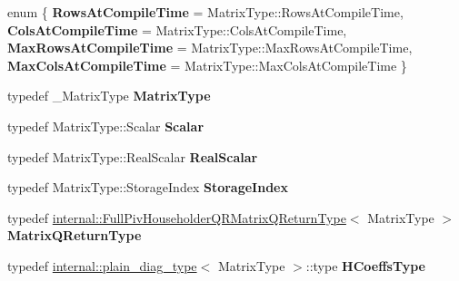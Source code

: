 \begin{DoxyCompactItemize}
\item 
\mbox{\label{class_eigen_1_1_full_piv_householder_q_r_a9ffbaa6905395cb6b370116de617446d}} 
enum \{ {\bfseries Rows\+At\+Compile\+Time} = Matrix\+Type\+::Rows\+At\+Compile\+Time, 
{\bfseries Cols\+At\+Compile\+Time} = Matrix\+Type\+::Cols\+At\+Compile\+Time, 
{\bfseries Max\+Rows\+At\+Compile\+Time} = Matrix\+Type\+::Max\+Rows\+At\+Compile\+Time, 
{\bfseries Max\+Cols\+At\+Compile\+Time} = Matrix\+Type\+::Max\+Cols\+At\+Compile\+Time
 \}
\item 
\mbox{\label{class_eigen_1_1_full_piv_householder_q_r_aad34d3573bf47e18888d1bb4801e7473}} 
typedef \+\_\+\+Matrix\+Type {\bfseries Matrix\+Type}
\item 
\mbox{\label{class_eigen_1_1_full_piv_householder_q_r_a30eb2e756bcd1c1148142a3a0deb6f88}} 
typedef Matrix\+Type\+::\+Scalar {\bfseries Scalar}
\item 
\mbox{\label{class_eigen_1_1_full_piv_householder_q_r_a22c6a854a83225617e56c03cbdbc94c3}} 
typedef Matrix\+Type\+::\+Real\+Scalar {\bfseries Real\+Scalar}
\item 
\mbox{\label{class_eigen_1_1_full_piv_householder_q_r_a55934e8ed065b629ca86382863fc66b0}} 
typedef Matrix\+Type\+::\+Storage\+Index {\bfseries Storage\+Index}
\item 
\mbox{\label{class_eigen_1_1_full_piv_householder_q_r_aca49f0aada2187c4b37b59211188a267}} 
typedef \mbox{\hyperlink{struct_eigen_1_1internal_1_1_full_piv_householder_q_r_matrix_q_return_type}{internal\+::\+Full\+Piv\+Householder\+Q\+R\+Matrix\+Q\+Return\+Type}}$<$ Matrix\+Type $>$ {\bfseries Matrix\+Q\+Return\+Type}
\item 
\mbox{\label{class_eigen_1_1_full_piv_householder_q_r_ace3d0a40673c063c78035548c4259806}} 
typedef \mbox{\hyperlink{struct_eigen_1_1internal_1_1plain__diag__type}{internal\+::plain\+\_\+diag\+\_\+type}}$<$ Matrix\+Type $>$\+::type {\bfseries H\+Coeffs\+Type}

\end{DoxyCompactItemize}
